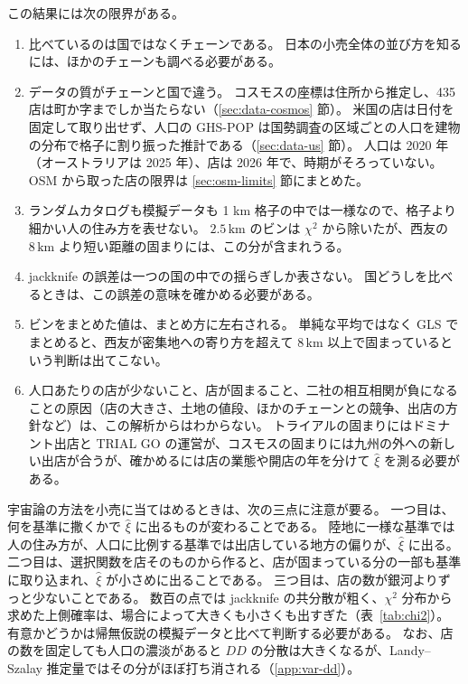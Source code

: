 \documentclass[a4paper,11pt]{ltjsarticle}
\begin{document}
この結果には次の限界がある。
\begin{enumerate}
  \item 比べているのは国ではなくチェーンである。
    日本の小売全体の並び方を知るには、ほかのチェーンも調べる必要がある。
  \item データの質がチェーンと国で違う。
    コスモスの座標は住所から推定し、435 店は町か字までしか当たらない（\ref{sec:data-cosmos} 節）。
    米国の店は日付を固定して取り出せず、人口の GHS-POP は国勢調査の区域ごとの人口を建物の分布で格子に割り振った推計である（\ref{sec:data-us} 節）。
    人口は 2020 年（オーストラリアは 2025 年）、店は 2026 年で、時期がそろっていない。
    OSM から取った店の限界は \ref{sec:osm-limits} 節にまとめた。
  \item ランダムカタログも模擬データも 1 km 格子の中では一様なので、格子より細かい人の住み方を表せない。
    $2.5\,\mathrm{km}$ のビンは $\chi^2$ から除いたが、西友の $8\,\mathrm{km}$ より短い距離の固まりには、この分が含まれうる。
  \item jackknife の誤差は一つの国の中での揺らぎしか表さない。
    国どうしを比べるときは、この誤差の意味を確かめる必要がある。
  \item ビンをまとめた値は、まとめ方に左右される。
    単純な平均ではなく GLS でまとめると、西友が密集地への寄り方を超えて $8\,\mathrm{km}$ 以上で固まっているという判断は出てこない。
  \item 人口あたりの店が少ないこと、店が固まること、二社の相互相関が負になることの原因（店の大きさ、土地の値段、ほかのチェーンとの競争、出店の方針など）は、この解析からはわからない。
    トライアルの固まりにはドミナント出店と TRIAL GO の運営が、コスモスの固まりには九州の外への新しい出店が合うが、確かめるには店の業態や開店の年を分けて $\hat\xi$ を測る必要がある。
\end{enumerate}

宇宙論の方法を小売に当てはめるときは、次の三点に注意が要る。
一つ目は、何を基準に撒くかで $\hat\xi$ に出るものが変わることである。
陸地に一様な基準では人の住み方が、人口に比例する基準では出店している地方の偏りが、$\hat\xi$ に出る。
二つ目は、選択関数を店そのものから作ると、店が固まっている分の一部も基準に取り込まれ、$\hat\xi$ が小さめに出ることである。
三つ目は、店の数が銀河よりずっと少ないことである。
数百の点では jackknife の共分散が粗く、$\chi^2$ 分布から求めた上側確率は、場合によって大きくも小さくも出すぎた（表~\ref{tab:chi2}）。
有意かどうかは帰無仮説の模擬データと比べて判断する必要がある。
なお、店の数を固定しても人口の濃淡があると $DD$ の分散は大きくなるが、Landy--Szalay 推定量ではその分がほぼ打ち消される（\ref{app:var-dd}）。
\end{document}
